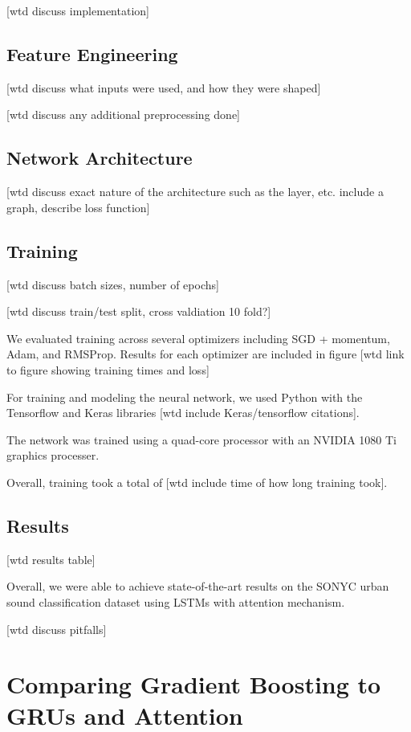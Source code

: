 \documentclass[a4paper,11pt,twoside]{scrbook}
\begin{document}
[wtd discuss implementation]

\section{Feature Engineering}

[wtd discuss what inputs were used, and how they were shaped]

[wtd discuss any additional preprocessing done]

\section{Network Architecture}

[wtd discuss exact nature of the architecture such as the layer, etc. include a graph, describe loss function]

\section{Training}

[wtd discuss batch sizes, number of epochs]

[wtd discuss train/test split, cross valdiation 10 fold?]

We evaluated training across several optimizers including SGD + momentum, Adam, and RMSProp.  Results for each optimizer are included in figure [wtd link to figure showing training times and loss]

For training and modeling the neural network, we used Python with the Tensorflow and Keras libraries [wtd include Keras/tensorflow citations].

The network was trained using a quad-core processor with an NVIDIA 1080 Ti graphics processer.

Overall, training took a total of [wtd include time of how long training took].

\section{Results}

[wtd results table]

Overall, we were able to achieve state-of-the-art results on the SONYC urban sound classification dataset using LSTMs with attention mechanism.

[wtd discuss pitfalls]

\chapter{Comparing Gradient Boosting to GRUs and Attention}
\end{document}

